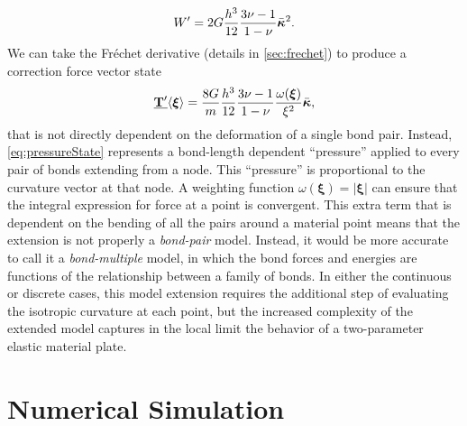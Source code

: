 \documentclass[preprint,review,12pt]{elsarticle}
\newcommand\vstate[3]{%
	\mathbf{\underline{#1}}%
	\ifstrempty{#2}{}{[#2]}%
	\ifstrempty{#3}{}{\langle #3 \rangle}}
\begin{document}
%
\begin{equation}
    W'=2G\frac{h^3}{12}\frac{3\nu-1}{1-\nu}\bar{\boldsymbol{\kappa}}^2. \notag
\end{equation}
%
We can take the Fr\'{e}chet derivative (details in \ref{sec:frechet}) to produce a correction force vector state
%
\begin{equation}
    \vstate{T'}{}{\boldsymbol{\xi}}=\frac{8G}{m}\frac{h^3}{12}\frac{3\nu-1}{1-\nu}\frac{\omega(\boldsymbol{\xi})}{\xi^2} \bar{\boldsymbol{\kappa}},
    \label{eq:pressureState}
\end{equation}
%
that is not directly dependent on the deformation of a single bond pair.  Instead, \cref{eq:pressureState} represents a bond-length dependent ``pressure'' applied to every pair of bonds extending from a node.  This ``pressure'' is proportional to the curvature vector at that node.
A weighting function \(\omega(\boldsymbol{\xi}) = |\boldsymbol{\xi}|\) can ensure that the integral expression for force at a point is convergent.  This extra term that is dependent on the bending of all the pairs around a material point means that the extension is not properly a \textit{bond-pair} model.  Instead, it would be more accurate to call it a \textit{bond-multiple} model, in which the bond forces and energies are functions of the relationship between a family of bonds.  In either the continuous or discrete cases, this model extension requires the additional step of evaluating the isotropic curvature at each point, but the increased complexity of the extended model captures in the local limit the behavior of a two-parameter elastic material plate.
%
\section{Numerical Simulation}
\end{document}
